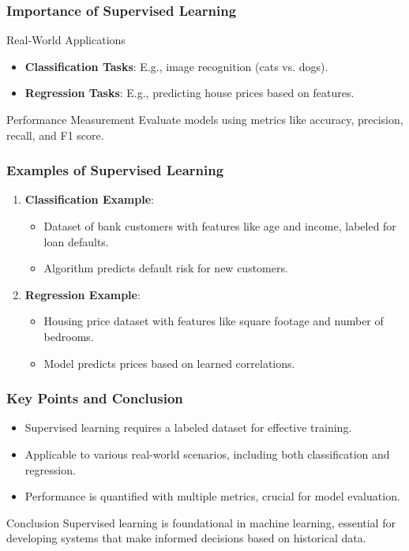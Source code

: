 \documentclass[aspectratio=169]{beamer}
\begin{document}
\begin{frame}[fragile]
    \frametitle{Importance of Supervised Learning}
    \begin{block}{Real-World Applications}
        \begin{itemize}
            \item \textbf{Classification Tasks}: E.g., image recognition (cats vs. dogs).
            \item \textbf{Regression Tasks}: E.g., predicting house prices based on features.
        \end{itemize}
    \end{block}

    \begin{block}{Performance Measurement}
        Evaluate models using metrics like accuracy, precision, recall, and F1 score.
    \end{block}
\end{frame}

\begin{frame}[fragile]
    \frametitle{Examples of Supervised Learning}
    \begin{enumerate}
        \item \textbf{Classification Example}:
            \begin{itemize}
                \item Dataset of bank customers with features like age and income, labeled for loan defaults.
                \item Algorithm predicts default risk for new customers.
            \end{itemize}
        
        \item \textbf{Regression Example}:
            \begin{itemize}
                \item Housing price dataset with features like square footage and number of bedrooms.
                \item Model predicts prices based on learned correlations.
            \end{itemize}
    \end{enumerate}
\end{frame}

\begin{frame}[fragile]
    \frametitle{Key Points and Conclusion}
    \begin{itemize}
        \item Supervised learning requires a labeled dataset for effective training.
        \item Applicable to various real-world scenarios, including both classification and regression.
        \item Performance is quantified with multiple metrics, crucial for model evaluation.
    \end{itemize}
    
    \begin{block}{Conclusion}
        Supervised learning is foundational in machine learning, essential for developing systems that make informed decisions based on historical data.
    \end{block}
\end{frame}
\end{document}
